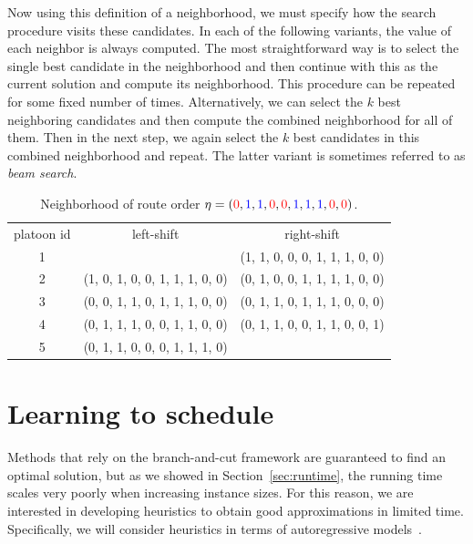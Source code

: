 \documentclass[a4paper]{article}
\theoremstyle{definition}
\theoremstyle{plain}
\begin{document}
Now using this definition of a neighborhood, we must specify how the search
procedure visits these candidates.
In each of the following variants, the value of each neighbor is always computed.
%
The most straightforward way is to select the single best candidate in the
neighborhood and then continue with this as the current solution and compute its
neighborhood. This procedure can be repeated for some fixed number of times.
Alternatively, we can select the $k$ best neighboring candidates and then
compute the combined neighborhood for all of them. Then in the next step, we
again select the $k$ best candidates in this combined neighborhood and repeat.
The latter variant is sometimes referred to as \textit{beam search}.

\newcommand*{\1}{{\color{blue}1}}%
\newcommand*{\0}{{\color{red}0}}%

\begin{table}
\caption{Neighborhood of route order $\eta = (\0, \1, \1, \0, \0, \1, \1, \1, \0, \0)$.}
\label{tab:local_search}
\begin{center}
\begin{tabular}{c|c|c}
  platoon id  & left-shift & right-shift \\
  1 &  & (\1, \1, \0, \0, \0, \1, \1, \1, \0, \0) \\
  2 & (\1, \0, \1, \0, \0, \1, \1, \1, \0, \0) & (\0, \1, \0, \0, \1, \1, \1, \1, \0, \0) \\
  3 & (\0, \0, \1, \1, \0, \1, \1, \1, \0, \0) & (\0, \1, \1, \0, \1, \1, \1, \0, \0, \0) \\
  4 & (\0, \1, \1, \1, \0, \0, \1, \1, \0, \0) & (\0, \1, \1, \0, \0, \1, \1, \0, \0, \1) \\
  5 & (\0, \1, \1, \0, \0, \0, \1, \1, \1, \0) &
\end{tabular}
\end{center}
\end{table}

\section{Learning to schedule}

Methods that rely on the branch-and-cut framework are guaranteed to find an
optimal solution, but as we showed in Section~\ref{sec:runtime}, the running
time scales very poorly when increasing instance sizes. For this reason, we are
interested in developing heuristics to obtain good approximations in limited
time.
%
Specifically, we will consider heuristics in terms of autoregressive
models~\cite{tomczakDeepGenerativeModeling2024}.
\end{document}
